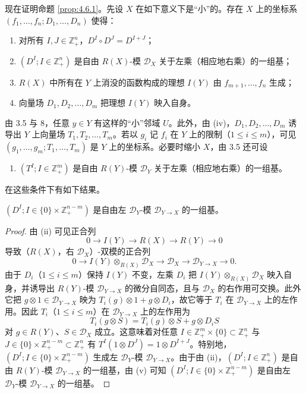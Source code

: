 现在证明命题 \ref{prop:4.6.1}。先设 $X$ 在如下意义下是“小”的。存在 $X$ 上的坐标系 $(f_1,\dots,f_n;D_1,\dots,D_n)$ 使得：
\begin{enumerate}[label=(\roman*)]
  \item 对所有 $I,J\in\mathbb{Z}_+^n$，$D^I\circ D^J=D^{I+J}$；
  \item $(D^I;I\in\mathbb{Z}_+^n)$ 是自由 $R(X)$-模 $\mathcal{D}_X$ 关于左乘（相应地右乘）的一组基；
  \item $R(X)$ 中所有在 $Y$ 上消没的函数构成的理想 $I(Y)$ 由 $f_{m+1},\dots,f_n$ 生成；
  \item 向量场 $D_1,D_2,\dots,D_m$ 把理想 $I(Y)$ 映入自身。
\end{enumerate}
由 3.5 与 8，任意 $y\in Y$ 有这样的“小”邻域 $U$。此外，由 (iv)，$D_1,D_2,\dots,D_m$ 诱导出 $Y$ 上向量场 $T_1,T_2,\dots,T_m$。若以 $g_i$ 记 $f_i$ 在 $Y$ 上的限制（$1\le i\le m$），可见 $(g_1,\dots,g_m;T_1,\dots,T_m)$ 是 $Y$ 上的坐标系。必要时缩小 $X$，由 3.5 还可设
\begin{enumerate}[label=(\roman*),resume]
  \item $(T^I;I\in\mathbb{Z}_+^m)$ 是自由 $R(Y)$-模 $\mathcal{D}_Y$ 关于左乘（相应地右乘）的一组基。
\end{enumerate}
在这些条件下有如下结果。

\begin{lemma}\label{lem:4.6.3}
$(D^I;I\in\{0\}\times\mathbb{Z}_+^{n-m})$ 是自由左 $\mathcal{D}_Y$-模 $\mathcal{D}_{Y\to X}$ 的一组基。
\end{lemma}

\begin{proof}
由 (ii) 可见正合列
$$0\longrightarrow I(Y)\longrightarrow R(X)\longrightarrow R(Y)\longrightarrow 0$$
导致（$R(X)$，右 $\mathcal{D}_X$）-双模的正合列
$$0\longrightarrow I(Y)\otimes_{R(X)}\mathcal{D}_X\longrightarrow\mathcal{D}_X
\longrightarrow\mathcal{D}_{Y\to X}\longrightarrow 0.$$
由于 $D_i$（$1\le i\le m$）保持 $I(Y)$ 不变，左乘 $D_i$ 把 $I(Y)\otimes_{R(X)}\mathcal{D}_X$ 映入自身，并诱导出 $R(Y)$-模 $\mathcal{D}_{Y\to X}$ 的微分自同态，且与 $\mathcal{D}_X$ 的右作用可交换。此外它把 $g\otimes1\in\mathcal{D}_{Y\to X}$ 映为 $T_i(g)\otimes1+g\otimes D_i$，故它等于 $T_i$ 在 $\mathcal{D}_{Y\to X}$ 上的左作用。因此 $T_i$（$1\le i\le m$）在 $\mathcal{D}_{Y\to X}$ 上的左作用为
$$T_i(g\otimes S)=T_i(g)\otimes S+g\otimes D_iS$$
对 $g\in R(Y)$、$S\in\mathcal{D}_X$ 成立。这意味着对任意
$I\in\mathbb{Z}_+^m\times\{0\}\subset\mathbb{Z}_+^n$ 与 $J\in\{0\}\times\mathbb{Z}_+^{n-m}\subset\mathbb{Z}_+^n$ 有
$T^I(1\otimes D^J)=1\otimes D^{I+J}$。特别地，$(D^I;I\in\{0\}\times\mathbb{Z}_+^{n-m})$ 生成左 $\mathcal{D}_Y$-模 $\mathcal{D}_{Y\to X}$。由于由 (ii)，$(D^I;I\in\mathbb{Z}_+^n)$ 是自由 $R(Y)$-模 $\mathcal{D}_{Y\to X}$ 的一组基，由 (v) 可知 $(D^I;I\in\{0\}\times\mathbb{Z}_+^{n-m})$ 是自由左 $\mathcal{D}_Y$-模 $\mathcal{D}_{Y\to X}$ 的一组基。
\end{proof}

